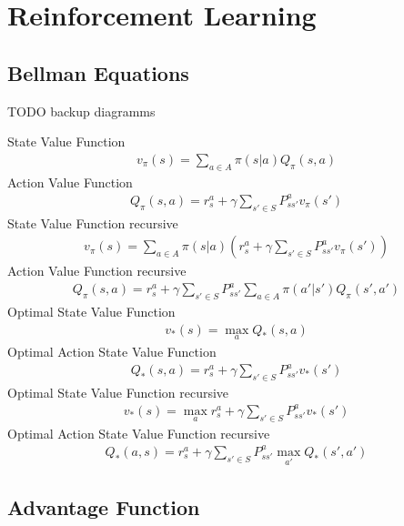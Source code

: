 \section{Reinforcement Learning}

\subsection{Bellman Equations}
\newcommand{\qfunc}[2]{Q_\pi(#1, #2)}
\newcommand{\vfunc}[1]{v_\pi (#1)}
\newcommand{\policy}[2]{\pi (#1 | #2)}

TODO backup diagramms

State Value Function 
\begin{align}
	\vfunc{s} = \sum_{a \in A} \policy{s}{a} \qfunc{s}{a}
\end{align}
Action Value Function 
\begin{align}
	\qfunc{s}{a} = r_s^a + \gamma \sum_{s' \in S} P_{ss'}^a \vfunc{s'}
\end{align}
State Value Function recursive
\begin{align}
	\vfunc{s} = \sum_{a \in A} \policy{s}{a} (r_s^a + \gamma \sum_{s' \in S} P_{ss'}^a \vfunc{s'})
\end{align}
Action Value Function recursive
\begin{align}
	\qfunc{s}{a} = r_s^a + \gamma \sum_{s' \in S} P_{ss'}^a \sum_{a \in A} \policy{a'}{s'}\qfunc{s'}{a'}
\end{align}
Optimal State Value Function
\renewcommand{\qfunc}[2]{Q_{*}(#1, #2)}
\renewcommand{\vfunc}[1]{v_{*} (#1)}
\begin{align}
	\vfunc{s} = \max_a \qfunc{s}{a}
\end{align}
Optimal Action State Value Function
\begin{align}
	\qfunc{s}{a} = r_s^a + \gamma \sum_{s' \in S} P_{ss'}^a \vfunc{s'}
\end{align}
Optimal State Value Function recursive
\begin{align}
	\vfunc{s} = \max\limits_a r_s^a + \gamma \sum_{s' \in S} P_{ss'}^a \vfunc{s'}
\end{align}
Optimal Action State Value Function recursive
\begin{align}
	\qfunc{a}{s} = r_s^a + \gamma \sum_{s' \in S} P_{ss'}^a \max\limits_{a'} \qfunc{s'}{a'}
\end{align}


\subsection{Advantage Function}

